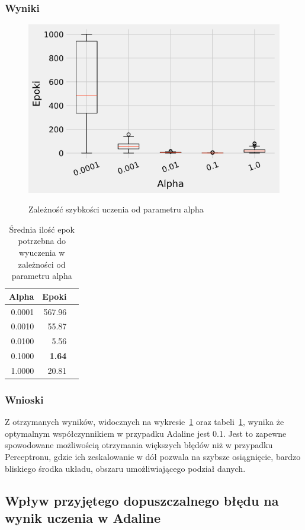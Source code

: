 \documentclass{article}
\begin{document}
\subsubsection*{Wyniki}

\begin{figure}[!h]
	\centering
	\caption{Zależność szybkości uczenia od parametru alpha}
	\includegraphics[width=.5\textwidth]{ada_alpha.png}
	\label{fig:res6}
\end{figure}

\begin{table}[!h]
	\caption{Średnia ilość epok potrzebna do wyuczenia w zależności od parametru alpha}
	\label{tabela-res-6}
	\centering
	\begin{tabular}{rrr}
		\toprule
		Alpha  & Epoki         \\
		\midrule
		0.0001 & 567.96        \\
		0.0010 & 55.87         \\
		0.0100 & 5.56          \\
		0.1000 & \textbf{1.64} \\
		1.0000 & 20.81         \\
		\bottomrule
	\end{tabular}
\end{table}

\subsubsection*{Wnioski}

Z otrzymanych wyników, widocznych na wykresie~\ref{fig:res6} oraz tabeli~\ref{tabela-res-6}, wynika że optymalnym współczynnikiem w przypadku Adaline jest 0.1. Jest to zapewne spowodowane możliwością otrzymania większych błędów niż w przypadku Perceptronu, gdzie ich zeskalowanie w dół pozwala na szybsze osiągnięcie, bardzo bliskiego środka układu, obszaru umożliwiającego podział danych.

\newpage
\subsection{Wpływ przyjętego dopuszczalnego błędu na wynik uczenia w Adaline}
\end{document}
